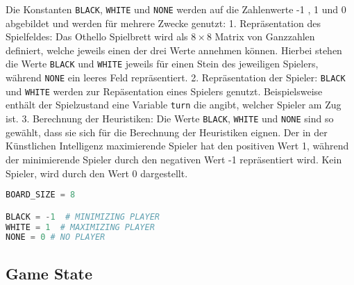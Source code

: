 Die Konstanten \passthrough{\lstinline!BLACK!},
\passthrough{\lstinline!WHITE!} und \passthrough{\lstinline!NONE!}
werden auf die Zahlenwerte -1 , 1 und 0 abgebildet und werden für
mehrere Zwecke genutzt: 1. Repräsentation des Spielfeldes: Das Othello
Spielbrett wird als \(8\times 8\) Matrix von Ganzzahlen definiert,
welche jeweils einen der drei Werte annehmen können. Hierbei stehen die
Werte \passthrough{\lstinline!BLACK!} und
\passthrough{\lstinline!WHITE!} jeweils für einen Stein des jeweiligen
Spielers, während \passthrough{\lstinline!NONE!} ein leeres Feld
repräsentiert. 2. Repräsentation der Spieler:
\passthrough{\lstinline!BLACK!} und \passthrough{\lstinline!WHITE!}
werden zur Repäsentation eines Spielers genutzt. Beispielsweise enthält
der Spielzustand eine Variable \passthrough{\lstinline!turn!} die
angibt, welcher Spieler am Zug ist. 3. Berechnung der Heuristiken: Die
Werte \passthrough{\lstinline!BLACK!}, \passthrough{\lstinline!WHITE!}
und \passthrough{\lstinline!NONE!} sind so gewählt, dass sie sich für
die Berechnung der Heuristiken eignen. Der in der Künstlichen
Intelligenz maximierende Spieler hat den positiven Wert 1, während der
minimierende Spieler durch den negativen Wert -1 repräsentiert wird.
Kein Spieler, wird durch den Wert 0 dargestellt.

\begin{lstlisting}[language=Python]
BOARD_SIZE = 8

BLACK = -1  # MINIMIZING PLAYER
WHITE = 1  # MAXIMIZING PLAYER
NONE = 0 # NO PLAYER
\end{lstlisting}

\hypertarget{game-state}{%
\subsection{Game State}\label{game-state}}


